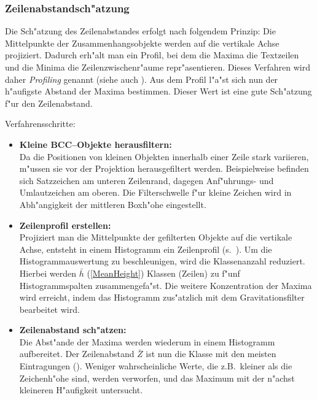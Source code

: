 
\subsubsection{Zeilenabstandsch"atzung}\label{Zeilenabstand}

Die Sch"atzung des Zeilenabstandes erfolgt nach folgendem Prinzip: Die Mittelpunkte der
Zusammenhangsobjekte werden auf die vertikale Achse projiziert.
Dadurch erh"alt man ein Profil, bei dem die Maxima
die Textzeilen und die Minima die Zeilenzwischenr"aume repr"asentieren. Dieses Verfahren wird
daher {\em Profiling\/} genannt (siehe auch \cite{Bohnacker93}).
Aus dem Profil l"a"st sich nun der h"aufigste Abstand der Maxima
bestimmen. Dieser Wert ist eine gute Sch"atzung f"ur den Zeilenabstand.

Verfahrensschritte:
\begin{itemize}
  \item{\bf Kleine BCC--Objekte herausfiltern:}\\
  Da die Positionen von kleinen Objekten innerhalb einer Zeile stark variieren, m"ussen
  sie vor der Projektion herausgefiltert werden. Beispielweise befinden sich Satzzeichen am
  unteren Zeilenrand, dagegen Anf"uhrungs- und Umlautzeichen am oberen. Die Filterschwelle
  f"ur kleine Zeichen wird in Abh"angigkeit der mittleren Boxh"ohe eingestellt.

  \item {\bf Zeilenprofil erstellen:}\\
        Projiziert man die Mittelpunkte der gefilterten Objekte auf die vertikale Achse, entsteht
        in einem Histogramm ein Zeilenprofil (s.\ ).
        Um die Histogramm\-auswertung zu beschleunigen, wird die Klassenanzahl reduziert. Hierbei werden
        $\bar{h}$ (\ref{MeanHeight}) Klassen (Zeilen) zu f"unf Histogrammspalten zusammengefa"st.
        Die weitere Konzentration der Maxima wird erreicht, indem das Histogramm zus"atzlich
        mit dem Gravitationsfilter bearbeitet wird.

        \item{\bf Zeilenabstand sch"atzen:}\\
        Die Abst"ande der Maxima werden wiederum in einem Histogramm aufbereitet.
        Der Zeilenabstand $\bar{Z}$ ist nun die Klasse mit den meisten Eintragungen ().
        Weniger wahrscheinliche Werte, die z.B.\
        kleiner als die Zeichenh"ohe sind, werden verworfen, und das Maximum mit der
        n"achst kleineren H"aufigkeit untersucht.
\end{itemize}

